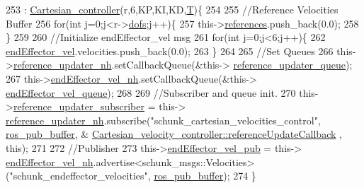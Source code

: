 \begin{DoxyCode}
253                                                                                                            
                : \hyperlink{classCartesian__controller_a71055bb1cbf01ced9e64bb1d184b68fe}{Cartesian\_controller}(r,6,KP,KI,KD,\hyperlink{classCartesian__controller_a35c6ddbb9624878f2807ff644a33e832}{T})\{
254 
255         \textcolor{comment}{//Reference Velocities Buffer}
256         \textcolor{keywordflow}{for}(\textcolor{keywordtype}{int} j=0;j<r->\hyperlink{structRobot_a51d4a86ac5314a1ed8614d5664c80747}{dofs};j++)\{
257                 this->\hyperlink{classCartesian__velocity__controller_afc3792f1f6dd0025417d752a89e519e1}{references}.push\_back(0.0);
258         \}
259 
260         \textcolor{comment}{//Initialize endEffector\_vel msg}
261         \textcolor{keywordflow}{for}(\textcolor{keywordtype}{int} j=0;j<6;j++)\{
262                 \hyperlink{classCartesian__velocity__controller_ae771d963a90ad7b844c4c3a821ce5f39}{endEffector\_vel}.velocities.push\_back(0.0);
263         \}
264 
265         \textcolor{comment}{//Set Queues}
266         this->\hyperlink{classCartesian__velocity__controller_a7d04d378a2a6d19870a620883dcd3e09}{reference\_updater\_nh}.setCallbackQueue(&this->
      \hyperlink{classCartesian__velocity__controller_ad2804cf83a42305d18572abdbbfd1c3f}{reference\_updater\_queue});
267         this->\hyperlink{classCartesian__velocity__controller_a01cbe7f951c69ded8604e552a0a706e0}{endEffector\_vel\_nh}.setCallbackQueue(&this->
      \hyperlink{classCartesian__velocity__controller_af154b0cda931081b52224eb22e4680f7}{endEffector\_vel\_queue});
268 
269         \textcolor{comment}{//Subscriber and queue init.}
270         this->\hyperlink{classCartesian__velocity__controller_a75412b9859afe4b800f9613c9cb8d17f}{reference\_updater\_subscriber}  = this->
      \hyperlink{classCartesian__velocity__controller_a7d04d378a2a6d19870a620883dcd3e09}{reference\_updater\_nh}.subscribe(\textcolor{stringliteral}{"schunk\_cartesian\_velocities\_control"}, 
      \hyperlink{classCartesian__controller_ab9ed5a808da204dbc612d313dc7332f4}{ros\_pub\_buffer}, &
      \hyperlink{classCartesian__velocity__controller_a2f020f22b2e63da5afeff3f083e4095c}{Cartesian\_velocity\_controller::referenceUpdateCallback}
      , \textcolor{keyword}{this});
271 
272         \textcolor{comment}{//Publisher}
273         this->\hyperlink{classCartesian__velocity__controller_ab12287816ae785d3cd6243b3df0cffc6}{endEffector\_vel\_pub}   = this->
      \hyperlink{classCartesian__velocity__controller_a01cbe7f951c69ded8604e552a0a706e0}{endEffector\_vel\_nh}.advertise<schunk\_msgs::Velocities>(\textcolor{stringliteral}{"schunk\_endeffector\_velocities"}, 
      \hyperlink{classCartesian__controller_ab9ed5a808da204dbc612d313dc7332f4}{ros\_pub\_buffer});
274 \}
\end{DoxyCode}


